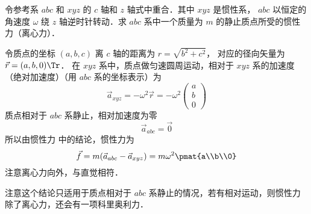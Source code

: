 

令参考系 $abc$ 和 $xyz$ 的 $c$ 轴和 $z$ 轴式中重合．其中 $xyz$ 是惯性系， $abc$ 以恒定的角速度 $\omega$ 绕 $z$ 轴逆时针转动．求 $abc$ 系中一个质量为 $m$ 的静止质点所受的惯性力（离心力）．

令质点的坐标 $(a,b,c)$ 离 $c$ 轴的距离为 $r = \sqrt {{b^2} + {c^2}}$， 对应的径向矢量为 $\vec r = (a,b,0)\Tr$． 在 $xyz$ 系中，质点做匀速圆周运动，相对于 $xyz$ 系的加速度（绝对加速度）（用 $abc$ 系的坐标表示）为
\begin{equation}
{\vec a_{xyz}} =  - {\omega ^2}\vec r =  - {\omega ^2}\begin{pmatrix} a\\b\\0 \end{pmatrix}
\end{equation}
质点相对于 $abc$ 系静止，相对加速度为零
\begin{equation}
{\vec a_{abc}} = \vec 0
\end{equation}
所以由惯性力 中的结论，惯性力为
\begin{equation}
\vec f = m(\vec a_{abc} - \vec a_{xyz} ) = m\omega ^2\pmat{a\\b\\0}
\end{equation}
注意离心力向外，与直觉相符．

注意这个结论只适用于质点相对于 $abc$ 系静止的情况，若有相对运动，则惯性力除了离心力，还会有一项科里奥利力．